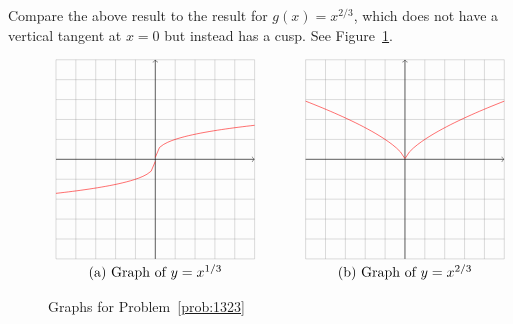 \documentclass{article}
\begin{document}
\begin{enumerate}
\begin{enumerate}
    Compare the above result to the result for $g(x)=x^{2/3}$, which
    does not have a vertical tangent at $x=0$ but instead has a cusp.
    See Figure~\ref{fig:1323}.
  \end{enumerate}
  \begin{figure}[htbp]
    \centering
    $\begin{array}{c@{\hspace{0.5in}}c}
    \begin{tikzpicture}[scale=0.5]
      \draw[gray,very thin] (-5,-5) grid (5,5);
      \draw[->] (-5,0)--(5,0);
      \draw[->] (0,-5)--(0,5);
      \draw[color=red,domain=-5:-0.001] plot(\x,{(-1)*(abs(\x))^(0.333)}); %
      \draw[color=red,domain=0.001:5] plot(\x,{(abs(\x))^(0.333)}); %
    \end{tikzpicture}
    &
    \begin{tikzpicture}[scale=0.5]
      \draw[gray,very thin] (-5,-5) grid (5,5);
      \draw[->] (-5,0)--(5,0);
      \draw[->] (0,-5)--(0,5);
      \draw[color=red,domain=-5:-0.01] plot(\x,{(abs(\x))^(0.666)}); %
      \draw[color=red,domain=0.01:5] plot(\x,{(abs(\x))^(0.666)}); %
    \end{tikzpicture}
    \\
    \mbox{(a) Graph of $y=x^{1/3}$}
    &
    \mbox{(b) Graph of $y=x^{2/3}$}
    \end{array}$
    \caption{Graphs for Problem~\ref{prob:1323}}
    \label{fig:1323}
  \end{figure}


\end{enumerate}
\end{document}
